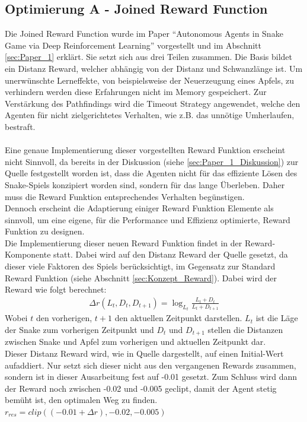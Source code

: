 \subsection{Optimierung A - Joined Reward Function} \label{sec:Konzept_Optimierung01}
Die Joined Reward Function wurde im Paper "`Autonomous Agents in Snake Game via Deep Reinforcement Learning"' \cite{Autonomous_Agents_in_Snake_Game_via_DRL} vorgestellt und im Abschnitt \ref{sec:Paper_1} erklärt. Sie setzt sich aus drei Teilen zusammen. Die Basis bildet ein Distanz Reward, welcher abhängig von der Distanz und Schwanzlänge ist. Um unerwünschte Lerneffekte, von beispielsweise der Neuerzeugung eines Apfels, zu verhindern werden diese Erfahrungen nicht im Memory gespeichert. Zur Verstärkung des Pathfindings wird die Timeout Strategy angewendet, welche den Agenten für nicht zielgerichtetes Verhalten, wie z.B. das unnötige Umherlaufen, bestraft.\\
\\Eine genaue Implementierung dieser vorgestellten Reward Funktion erscheint nicht Sinnvoll, da bereits in der Diskussion (siehe \ref{sec:Paper_1_Diskussion}) zur Quelle \cite{Autonomous_Agents_in_Snake_Game_via_DRL} festgestellt worden ist, dass die Agenten nicht für das effiziente Lösen des Snake-Spiels konzipiert worden sind, sondern für das lange Überleben. Daher muss die Reward Funktion entsprechendes Verhalten begünstigen.\\
Dennoch erscheint die Adaptierung einiger Reward Funktion Elemente als sinnvoll, um eine eigene, für die Performance und Effizienz optimierte, Reward Funktion zu designen.\\
Die Implementierung dieser neuen Reward Funktion findet in der Reward-Komponente statt. 
Dabei wird auf den Distanz Reward der Quelle \cite{Autonomous_Agents_in_Snake_Game_via_DRL} gesetzt, da dieser viele Faktoren des Spiels berücksichtigt, im Gegensatz zur Standard Reward Funktion (siehe Abschnitt \ref{sec:Konzept_Reward}). Dabei wird der Reward wie folgt berechnet:
\begin{align}
	\Delta r(L_t, D_t,D_{t+1}) = \log_{L_t}\frac{L_t + D_t}{L_t + D_{t + 1}}
\end{align}
Wobei $t$ den vorherigen, $t+1$ den aktuellen Zeitpunkt darstellen. $L_t$ ist die Läge der Snake zum vorherigen Zeitpunkt und $D_t$ und $D_{t+1}$ stellen die Distanzen zwischen Snake und Apfel zum vorherigen und aktuellen Zeitpunkt dar.\\
Dieser Distanz Reward wird, wie in Quelle \cite{Autonomous_Agents_in_Snake_Game_via_DRL} dargestellt, auf einen Initial-Wert aufaddiert. Nur setzt sich dieser nicht aus den vergangenen Rewards zusammen, sondern ist in dieser Ausarbeitung fest auf -0.01 gesetzt. Zum Schluss wird dann der Reward noch zwischen -0.02 und -0.005 geclipt, damit der Agent stetig bemüht ist, den optimalen Weg zu finden.
$r_{res} = clip((-0.01 + \Delta r), -0.02, -0.005)$

